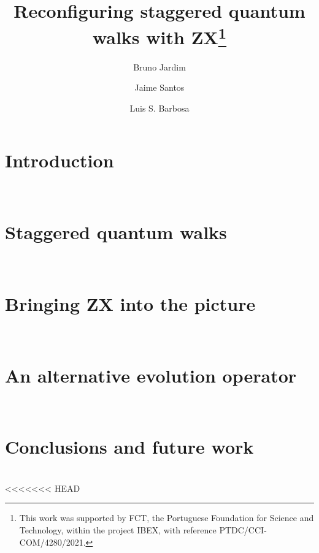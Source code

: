 \documentclass{llncs}
\begin{document}
%

\title{Reconfiguring staggered quantum walks with ZX\thanks{This work was supported by FCT, the Portuguese Foundation for Science and Technology, within the project IBEX, with reference PTDC/CCI-COM/4280/2021.}}

%
%
\author{Bruno Jardim  \and Jaime Santos \and Luis S. Barbosa}
%
%


\maketitle

\begin{abstract}
    
\end{abstract}

\section{Introduction}
\label{sec:introduction}

~\\

\section{Staggered quantum walks}
\label{sec:staggered}

~\\
%

\section{Bringing ZX into the picture}
\label{sec:sqw}

~\\

\section{An alternative evolution operator}
\label{sec:ev-op}

~\\

\section{Conclusions and future work}
\label{sec:conclusion}

~\\







<<<<<<< HEAD
\end{document}
